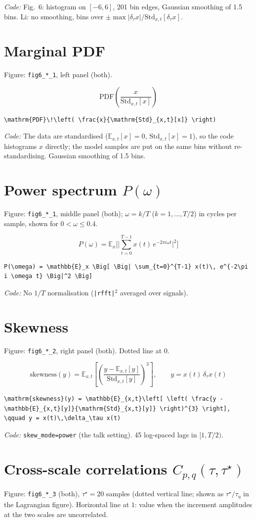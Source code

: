 \documentclass[11pt]{article}
\newcommand{\codenote}[1]{{\small\color{notegray}\emph{Code:} #1\par}}
\begin{document}
\codenote{Fig.~6: histogram on $[-6, 6]$, 201 bin edges, Gaussian smoothing of 1.5 bins. Li: no smoothing, bins over $\pm\max|\delta_\tau x|/\mathrm{Std}_{x,t}[\delta_\tau x]$.}
\section{Marginal PDF}
Figure: \texttt{fig6\_*\_1}, left panel (both).

\[
\mathrm{PDF}\!\left( \frac{x}{\mathrm{Std}_{x,t}[x]} \right)
\]
\begin{lstlisting}
\mathrm{PDF}\!\left( \frac{x}{\mathrm{Std}_{x,t}[x]} \right)
\end{lstlisting}
\codenote{The data are standardised ($\mathbb{E}_{x,t}[x] = 0$, $\mathrm{Std}_{x,t}[x] = 1$), so the code histograms $x$ directly; the model samples are put on the same bins without re-standardising. Gaussian smoothing of 1.5 bins.}
\section{Power spectrum $P(\omega)$}
Figure: \texttt{fig6\_*\_1}, middle panel (both); $\omega = k/T$ ($k = 1,\dots,T/2$) in cycles per sample, shown for $0 < \omega \le 0.4$.

\[
P(\omega) = \mathbb{E}_x \Big[ \Big| \sum_{t=0}^{T-1} x(t)\, e^{-2\pi i \omega t} \Big|^2 \Big]
\]
\begin{lstlisting}
P(\omega) = \mathbb{E}_x \Big[ \Big| \sum_{t=0}^{T-1} x(t)\, e^{-2\pi i \omega t} \Big|^2 \Big]
\end{lstlisting}
\codenote{No $1/T$ normalisation (\texttt{|rfft|}$^2$ averaged over signals).}
\section{Skewness}
Figure: \texttt{fig6\_*\_2}, right panel (both). Dotted line at $0$.

\[
\mathrm{skewness}(y) = \mathbb{E}_{x,t}\left[ \left( \frac{y - \mathbb{E}_{x,t}[y]}{\mathrm{Std}_{x,t}[y]} \right)^{3} \right], \qquad y = x(t)\,\delta_\tau x(t)
\]
\begin{lstlisting}
\mathrm{skewness}(y) = \mathbb{E}_{x,t}\left[ \left( \frac{y - \mathbb{E}_{x,t}[y]}{\mathrm{Std}_{x,t}[y]} \right)^{3} \right], \qquad y = x(t)\,\delta_\tau x(t)
\end{lstlisting}
\codenote{\texttt{skew\_mode=\textquotesingle power\textquotesingle} (the talk setting). 45 log-spaced lags in $[1, T/2)$.}
\section{Cross-scale correlations $C_{p,q}(\tau, \tau^\star)$}
Figure: \texttt{fig6\_*\_3} (both), $\tau^\star = 20$ samples (dotted vertical line; shown as $\tau^\star/\tau_\eta$ in the Lagrangian figure). Horizontal line at $1$: value when the increment amplitudes at the two scales are uncorrelated.
\end{document}
